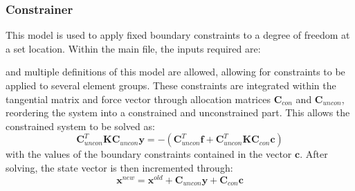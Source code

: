 \documentclass[3p]{elsarticle} %
\begin{document}
\subsubsection{Constrainer}
This model is used to apply fixed boundary constraints to a degree of freedom at a set location. Within the main file, the inputs required are:

and multiple definitions of this model are allowed, allowing for constraints to be applied to several element groups. These constraints are integrated within the tangential matrix and force vector through  allocation matrices $\bm{C}_{con}$ and $\bm{C}_{uncon}$, reordering the system into a constrained and unconstrained part. This allows the constrained system to be solved as:
\begin{equation}
	\bm{C}_{uncon}^T \bm{K} \bm{C}_{uncon} \mathbf{y} = -\left(\bm{C}_{uncon}^T\bm{f}+\bm{C}_{uncon}^T \bm{K} \bm{C}_{con}\mathbf{c}\right)
\end{equation}
with the values of the boundary constraints contained in the vector $\mathbf{c}$. After solving, the state vector is then incremented through:
\begin{equation}
	\mathbf{x}^{new} = \mathbf{x}^{old} + \bm{C}_{uncon}\mathbf{y} + \bm{C}_{con}\mathbf{c}
\end{equation}
\end{document}

